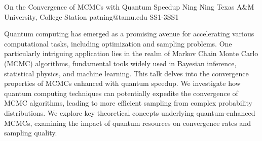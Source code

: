 \begin{talk}
  {On the Convergence of MCMCs with Quantum Speedup}%
  {Ning Ning}%
  {Texas A\&M University, College Station}%
  {patning@tamu.edu}%
  {}%
{}{}{SS1-3}{SS1}


				
				

Quantum computing has emerged as a promising avenue for accelerating various computational tasks, including optimization and sampling problems. One particularly intriguing application lies in the realm of Markov Chain Monte Carlo (MCMC) algorithms, fundamental tools widely used in Bayesian inference, statistical physics, and machine learning. This talk delves into the convergence properties of MCMCs enhanced with quantum speedup. We investigate how quantum computing techniques can potentially expedite the convergence of MCMC algorithms, leading to more efficient sampling from complex probability distributions. 
We explore key theoretical concepts underlying quantum-enhanced MCMCs, examining the impact of quantum resources on convergence rates and sampling quality.
\end{talk}

